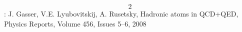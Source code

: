 \documentclass[preview]{standalone}
\begin{document}
\begin{center}
\[2\]: J. Gasser, V.E. Lyubovitskij, A. Rusetsky, Hadronic atoms in QCD+QED, Physics Reports, Volume 456, Issues 5–6, 2008
\end{center}
\end{document}
